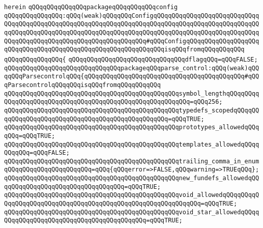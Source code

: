 \verb|herein|\newline
\newline
\verb|qQQqqQQqqQQqqQQqpackageqQQqqQQqqQQqconfig|\newline
\verb|qQQqqQQqqQQqqQQq:qQQq(weak)qQQqqQQqConfigqQQqqQQqqQQqqQQqqQQqqQQqqQQqqQQqqQQqqQQqqQQqqQQqqQQqqQQqqQQqqQQqqQQqqQQqqQQqqQQqqQQqqQQqqQQqqQQqqQQqqQQqqQQqqQQqqQQqqQQqqQQqqQQqqQQqqQQqqQQqqQQqqQQqqQQqqQQqqQQqqQQqqQQqqQQqqQQqqQQqqQQqqQQqqQQqqQQqqQQqqQQqqQQq#qQQqConfigqQQqqQQqqQQqqQQqqQQqqQQqqQQqqQQqqQQqqQQqqQQqqQQqqQQqqQQqqQQqqQQqisqQQqfromqQQqqQQqqQQq|\newline
\verb|qQQqqQQqqQQqqQQq{|\newline
\verb|qQQqqQQqqQQqqQQqqQQqqQQqqQQqqQQqdflagqQQq=qQQqFALSE;|\newline
\newline
\verb|qQQqqQQqqQQqqQQqqQQqqQQqqQQqqQQqpackageqQQqparse_control:qQQq(weak)qQQqqQQqParsecontrolqQQq{qQQqqQQqqQQqqQQqqQQqqQQqqQQqqQQqqQQqqQQqqQQq#qQQqParsecontrolqQQqqQQqisqQQqfromqQQqqQQqqQQq|\newline
\newline
\verb|qQQqqQQqqQQqqQQqqQQqqQQqqQQqqQQqqQQqqQQqqQQqqQQqsymbol_lengthqQQqqQQqqQQqqQQqqQQqqQQqqQQqqQQqqQQqqQQqqQQqqQQqqQQqqQQqqQQq=qQQq256;|\newline
\verb|qQQqqQQqqQQqqQQqqQQqqQQqqQQqqQQqqQQqqQQqqQQqqQQqtypedefs_scopedqQQqqQQqqQQqqQQqqQQqqQQqqQQqqQQqqQQqqQQqqQQqqQQqqQQq=qQQqTRUE;|\newline
\verb|qQQqqQQqqQQqqQQqqQQqqQQqqQQqqQQqqQQqqQQqqQQqqQQqprototypes_allowedqQQqqQQq=qQQqTRUE;|\newline
\verb|qQQqqQQqqQQqqQQqqQQqqQQqqQQqqQQqqQQqqQQqqQQqqQQqtemplates_allowedqQQqqQQqqQQq=qQQqFALSE;|\newline
\verb|qQQqqQQqqQQqqQQqqQQqqQQqqQQqqQQqqQQqqQQqqQQqqQQqtrailing_comma_in_enumqQQqqQQqqQQqqQQqqQQqqQQq=qQQq{qQQqerror=>FALSE,qQQqwarning=>TRUEqQQq};|\newline
\verb|qQQqqQQqqQQqqQQqqQQqqQQqqQQqqQQqqQQqqQQqqQQqqQQqnew_fundefs_allowedqQQqqQQqqQQqqQQqqQQqqQQqqQQqqQQqqQQq=qQQqTRUE;|\newline
\verb|qQQqqQQqqQQqqQQqqQQqqQQqqQQqqQQqqQQqqQQqqQQqqQQqvoid_allowedqQQqqQQqqQQqqQQqqQQqqQQqqQQqqQQqqQQqqQQqqQQqqQQqqQQqqQQqqQQqqQQq=qQQqTRUE;|\newline
\verb|qQQqqQQqqQQqqQQqqQQqqQQqqQQqqQQqqQQqqQQqqQQqqQQqvoid_star_allowedqQQqqQQqqQQqqQQqqQQqqQQqqQQqqQQqqQQqqQQqqQQq=qQQqTRUE;|\newline
